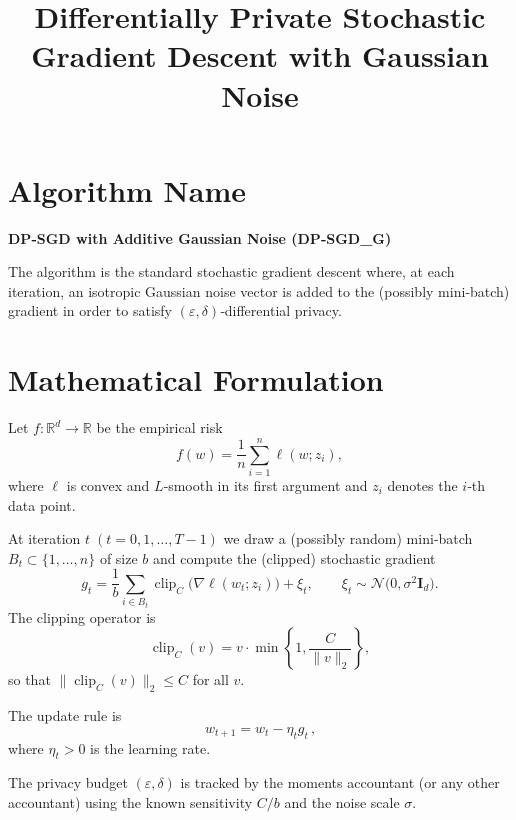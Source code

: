 \documentclass{article}
\begin{document}
\title{Differentially Private Stochastic Gradient Descent with Gaussian Noise}
\author{}
\date{}
\maketitle

\bigskip

\section*{Algorithm Name}
\textbf{DP‑SGD with Additive Gaussian Noise (DP‑SGD\_G)}  

The algorithm is the standard stochastic gradient descent where, at each iteration, an isotropic Gaussian noise vector is added to the (possibly mini‑batch) gradient in order to satisfy $(\varepsilon,\delta)$‑differential privacy.

\bigskip

\section*{Mathematical Formulation}
Let $f:\mathbb{R}^{d}\rightarrow\mathbb{R}$ be the empirical risk
\[
f(w)=\frac{1}{n}\sum_{i=1}^{n}\ell(w;z_i),
\]
where $\ell$ is convex and $L$‑smooth in its first argument and $z_i$ denotes the $i$‑th data point.  

At iteration $t\;(t=0,1,\dots,T-1)$ we draw a (possibly random) mini‑batch $B_t\subset\{1,\dots,n\}$ of size $b$ and compute the (clipped) stochastic gradient
\[
g_t = \frac{1}{b}\sum_{i\in B_t}\operatorname{clip}_C\bigl(\nabla\ell(w_t;z_i)\bigr)
      +\xi_t,
\qquad \xi_t\sim\mathcal{N}\bigl(0,\sigma^{2}\mathbf{I}_d\bigr).
\]
The clipping operator is
\[
\operatorname{clip}_C(v)=v\cdot\min\!\left\{1,\frac{C}{\|v\|_2}\right\},
\]
so that $\| \operatorname{clip}_C(v)\|_2\le C$ for all $v$.

The update rule is
\[
\boxed{\,w_{t+1}=w_t-\eta_t g_t\,},
\]
where $\eta_t>0$ is the learning rate.  

The privacy budget $(\varepsilon,\delta)$ is tracked by the moments accountant (or any other accountant) using the known sensitivity $C/b$ and the noise scale $\sigma$.

\bigskip
\end{document}
